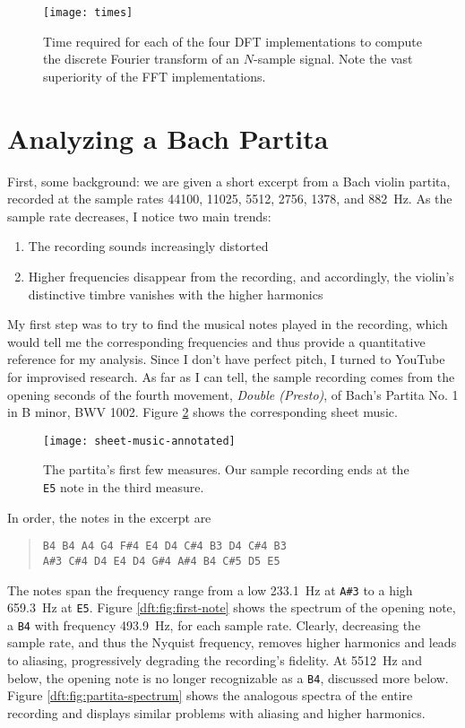 \documentclass[11pt, a4paper]{article}
\begin{document}
\begin{figure}
\centering
\texttt{[image: times]}
\vspace{-7mm}
\caption{Time required for each of the four DFT implementations to compute the discrete Fourier transform of an $ N $-sample signal. Note the vast superiority of the FFT implementations.}
\label{dft:fig:times}
\end{figure}


\section{Analyzing a Bach Partita} \label{dft:s:bach}
First, some background: we are given a short excerpt from a Bach violin partita, recorded at the sample rates 44100, 11025, 5512, 2756, 1378,  and \SI{882}{\hertz}. As the sample rate decreases, I notice two main trends:
\begin{enumerate}
	\item The recording sounds increasingly distorted
	\item Higher frequencies disappear from the recording, and accordingly, the violin's distinctive timbre vanishes with the higher harmonics
\end{enumerate}
My first step was to try to find the musical notes played in the recording, which would tell me the corresponding frequencies and thus provide a quantitative reference for my analysis. Since I don't have perfect pitch, I turned to YouTube for improvised research. As far as I can tell, the sample recording comes from the opening seconds of the fourth movement, \textit{Double (Presto)}, of Bach's Partita No. 1 in B minor, BWV 1002. Figure \ref{dft:fig:sheet-music} shows the corresponding sheet music.

\begin{figure}[htb!]
\centering
\texttt{[image: sheet-music-annotated]}
\caption{The partita's first few measures. Our sample recording ends at the \texttt{E5} note in the third measure.}
\label{dft:fig:sheet-music}
\end{figure}

In order, the notes in the excerpt are
\begin{quote}
	\texttt{B4 B4 A4 G4 F\#4 E4 D4 C\#4 B3 D4 C\#4 B3}\\ \texttt{A\#3 C\#4 D4 E4 D4 G\#4 A\#4 B4 C\#5 D5 E5}
\end{quote}
The notes span the frequency range from a low \SI{233.1}{\hertz} at \texttt{A\#3} to a high \SI{659.3}{\hertz} at \texttt{E5}. Figure \ref{dft:fig:first-note} shows the spectrum of the opening note, a \texttt{B4} with frequency \SI{493.9}{\hertz}, for each sample rate. Clearly, decreasing the sample rate, and thus the Nyquist frequency, removes higher harmonics and leads to aliasing, progressively degrading the recording's fidelity. At \SI{5512}{\hertz} and below, the opening note is no longer recognizable as a \texttt{B4}, discussed more below. Figure \ref{dft:fig:partita-spectrum} shows the analogous spectra of the entire recording and displays similar problems with aliasing and higher harmonics.
\end{document}

